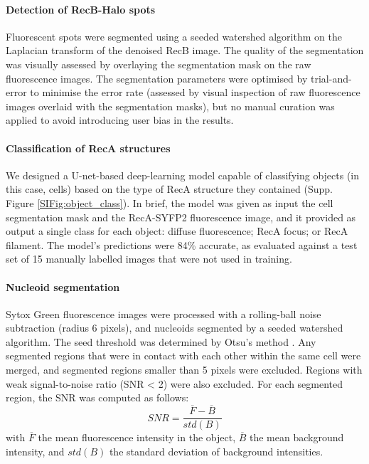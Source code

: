 \paragraph*{Detection of RecB-Halo spots}
Fluorescent spots were seg\-men\-ted using a seeded watershed algorithm on the Laplacian transform of the denoised RecB image. The quality of the segmentation was visually assessed by overlaying the segmentation mask on the raw fluorescence images. The segmentation parameters were optimised by trial-and-error to minimise the error rate (assessed by visual inspection of raw fluorescence images overlaid with the segmentation masks), but no manual curation was applied to avoid introducing user bias in the results.

\paragraph*{Classification of RecA structures}
We designed a U-net-based deep-learning model capable of classifying objects (in this case, cells) based on the type of RecA structure they contained (Supp. Figure \ref{SIFig:object_class}). In brief, the model was given as input the cell segmentation mask and the RecA-SYFP2 fluorescence image, and it provided as output a single class for each object: diffuse fluorescence; RecA focus; or RecA filament. The model's predictions were 84\% accurate, as evaluated against a test set of 15 manually labelled images that were not used in training.

\paragraph*{Nucleoid segmentation}
Sytox Green fluorescence images were processed with a rolling-ball noise subtraction (radius 6 pixels), and nucleoids segmented by a seeded watershed algorithm. The seed threshold was determined by Otsu's method \cite{Otsu1979}. Any segmented regions that were in contact with each other within the same cell were merged, and segmented regions smaller than 5 pixels were excluded. Regions with weak signal-to-noise ratio (SNR < 2) were also excluded. For each segmented region, the SNR was computed as follows:
\begin{equation}
    SNR = \dfrac{\overline{F}-\overline{B}}{std(B)}
\end{equation}
with $\overline{F}$ the mean fluorescence intensity in the object, $\overline{B}$ the mean background intensity, and $std(B)$ the standard deviation of background intensities.

